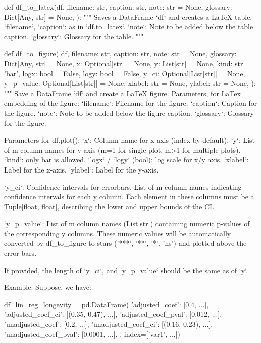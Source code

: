 \documentclass[11pt]{article}
\begin{document}
\begin{python}
def df_to_latex(df, 
        filename: str, caption: str,
        note: str = None, 
        glossary: Dict[Any, str] = None,
    ):
    """
    Saves a DataFrame `df` and creates a LaTeX table.
    `filename`, `caption`: as in `df.to_latex`.
    `note`: Note to be added below the table caption.
    `glossary`: Glossary for the table.
    """


def df_to_figure(
        df, filename: str, caption: str,
        note: str = None, glossary: Dict[Any, str] = None,
        x: Optional[str] = None, y: List[str] = None, 
        kind: str = 'bar',
        logx: bool = False, logy: bool = False,
        y_ci: Optional[List[str]] = None,
        y_p_value: Optional[List[str]] = None,
        xlabel: str = None, ylabel: str = None,
    ):
    """
    Save a DataFrame `df` and create a LaTeX figure.
    Parameters, for LaTex embedding of the figure:
    `filename`: Filename for the figure.
    `caption`: Caption for the figure.
    `note`: Note to be added below the figure caption.
    `glossary`: Glossary for the figure.

    Parameters for df.plot():
    `x`: Column name for x-axis (index by default).
    `y`: List of m column names for y-axis (m=1 for single plot, m>1 for multiple plots).
    `kind`: only bar is allowed.
    `logx` / `logy` (bool): log scale for x/y axis.
    `xlabel`: Label for the x-axis.
    `ylabel`: Label for the y-axis.

    `y_ci`: Confidence intervals for errorbars. 
        List of m column names indicating confidence intervals for each y column. 
        Each element in these columns must be a Tuple[float, float], describing the lower and upper bounds of the CI. 

     `y_p_value`: List of m column names (List[str]) containing numeric p-values of the corresponding y columns. These numeric values will be automatically converted by df_to_figure to stars ('***', '**', '*', 'ns') and plotted above the error bars.

    If provided, the length of `y_ci`, and `y_p_value` should be the same as of `y`.

    Example:
    Suppose, we have:

    df_lin_reg_longevity = pd.DataFrame({
        'adjusted_coef': [0.4, ...], 'adjusted_coef_ci': [(0.35, 0.47), ...], 'adjusted_coef_pval': [0.012, ...],   
        'unadjusted_coef': [0.2, ...], 'unadjusted_coef_ci': [(0.16, 0.23), ...], 'unadjusted_coef_pval': [0.0001, ...],
    }, index=['var1', ...])


\end{python}
\end{document}
